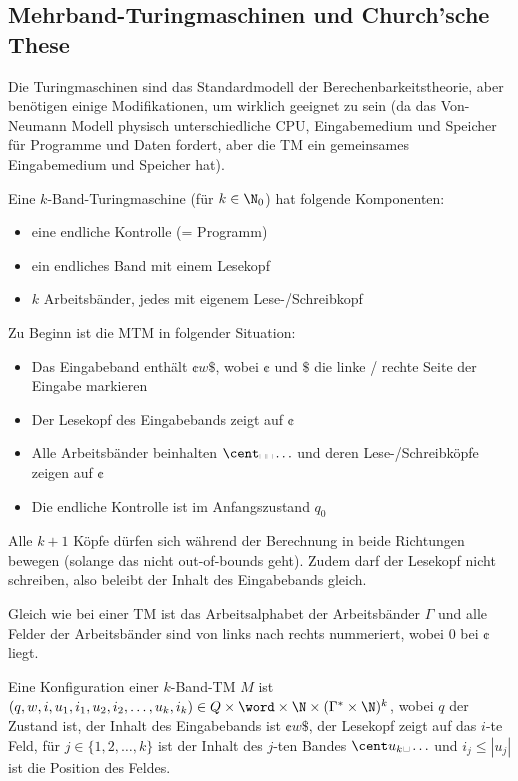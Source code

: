 \newsection
\subsection{Mehrband-Turingmaschinen und Church'sche These}
Die Turingmaschinen sind das Standardmodell der Berechenbarkeitstheorie, aber benötigen einige Modifikationen, um wirklich geeignet zu sein
(da das Von-Neumann Modell physisch unterschiedliche CPU, Eingabemedium und Speicher für Programme und Daten fordert, aber die TM ein gemeinsames Eingabemedium und Speicher hat).

Eine $k$-Band-Turingmaschine (für $k \in \N_0$) hat folgende Komponenten:
\begin{itemize}
    \item eine endliche Kontrolle (= Programm)
    \item ein endliches Band mit einem Lesekopf
    \item $k$ Arbeitsbänder, jedes mit eigenem Lese-/Schreibkopf
\end{itemize}
Zu Beginn ist die MTM in folgender Situation:
\begin{itemize}
    \item Das Eingabeband enthält $\cent w \$$, wobei $\cent$ und $\$$ die linke / rechte Seite der Eingabe markieren
    \item Der Lesekopf des Eingabebands zeigt auf $\cent$
    \item Alle Arbeitsbänder beinhalten $\cent \text{\textvisiblespace\textvisiblespace} \ldots$ und deren Lese-/Schreibköpfe zeigen auf $\cent$
    \item Die endliche Kontrolle ist im Anfangszustand $q_0$
\end{itemize}
Alle $k + 1$ Köpfe dürfen sich während der Berechnung in beide Richtungen bewegen (solange das nicht out-of-bounds geht).
Zudem darf der Lesekopf nicht schreiben, also beleibt der Inhalt des Eingabebands gleich.

Gleich wie bei einer TM ist das Arbeitsalphabet der Arbeitsbänder $\Gamma$ und alle Felder der Arbeitsbänder sind von links nach rechts nummeriert, wobei $0$ bei $\cent$ liegt.

Eine Konfiguration einer $k$-Band-TM $M$ ist $(q, w, i, u_1, i_1, u_2, i_2, \ldots, u_k, i_k) \in Q \times \word \times \N \times (\Gamma^* \times \N)^k$,
wobei $q$ der Zustand ist, der Inhalt des Eingabebands ist $\cent w \$$, der Lesekopf zeigt auf das $i$-te Feld,
für $j \in \{ 1, 2, \ldots, k \}$ ist der Inhalt des $j$-ten Bandes $\cent u_k \text{\textvisiblespace} \ldots$ und $i_j \leq |u_j|$ ist die Position des Feldes.

